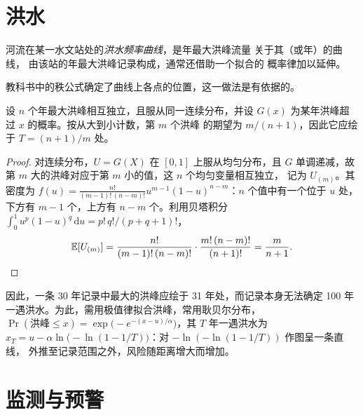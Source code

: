 \section{洪水}\label{sec:b2:geological-hazards:floods}

\begin{definition}[洪水频率曲线]\label{def:b2:geological-hazards:flood}
河流在某一水文站处的\emph{洪水频率曲线}，是年最大洪峰流量
关于其（或年）的曲线，
由该站的年最大洪峰记录构成，通常还借助一个拟合的
概率律加以延伸。
\end{definition}

教科书中的秩公式确定了曲线上各点的位置，这一做法是有依据的。

\begin{proposition}[威布尔绘点位置]\label{prop:b2:geological-hazards:weibull}
设 $n$ 个年最大洪峰相互独立，且服从同一连续分布，并设
$G(x)$ 为某年洪峰超过 $x$ 的概率。按从大到小计数，第 $m$ 个洪峰
的期望为 $m/(n + 1)$，因此它应绘于 $T = (n +
1)/m$ 处。
\end{proposition}

\begin{proof}
对连续分布，$U = G(X)$ 在 $[0, 1]$ 上服从均匀分布，且 $G$ 单调递减，故第
$m$ 大的洪峰对应于第 $m$ 小的值，这 $n$ 个均匀变量相互独立，
记为 $U_{(m)}$。其密度为 $f(u) = \frac{n!}{(m-1)!\,(n-m)!}u^{m-1}(1-u)^{n-m}$：$n$ 个值中有一个位于
$u$ 处，下方有 $m - 1$ 个，上方有 $n - m$ 个。利用贝塔积分 $\int_0^1 u^{p}(1-u)^{q}\,\mathrm{d}u
= p!\,q!/(p + q + 1)!$，
\begin{equation*}
\mathbb{E}[U_{(m)}] = \frac{n!}{(m-1)!\,(n-m)!}\cdot\frac{m!\,(n-m)!}{(n+1)!} = \frac{m}{n+1}. \qedhere
\end{equation*}
\end{proof}

因此，一条 30 年记录中最大的洪峰应绘于 31 年处，而记录本身无法确定
100 年一遇洪水。为此，需用极值律拟合洪峰，常用耿贝尔分布，
$\Pr(\text{洪峰} \leq x) = \exp\bigl(-e^{-(x - u)/\alpha}\bigr)$，其 $T$ 年一遇洪水为 $x_T = u
- \alpha\ln\bigl(-\ln(1 - 1/T)\bigr)$：对 $-\ln(-\ln(1 - 1/T))$ 作图呈一条直线，
外推至记录范围之外，风险随距离增大而增加。

\section{监测与预警}\label{sec:b2:geological-hazards:warning}

